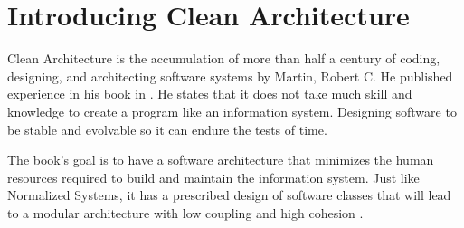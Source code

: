 \section{Introducing Clean Architecture}

Clean Architecture is the accumulation of more than half a century of coding, designing,
and architecting software systems by Martin, Robert C. He published experience in his book
 in \citeyear[]{martin_clean_2018}. He states that it does
not take much skill and knowledge to create a program like an information system.
Designing software to be stable and evolvable so it can endure the tests of time.

The book's goal is to have a software architecture that minimizes the human resources
required to build and maintain the information system. Just like Normalized Systems, it
has a prescribed design of software classes that will lead to a modular architecture with
low coupling and high cohesion \parencite{martin_clean_2018}.
